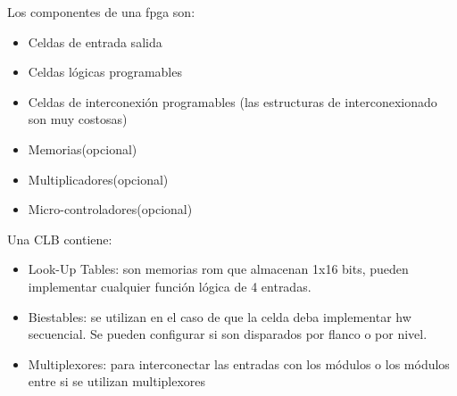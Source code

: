 Los componentes de una \gls{fpga} son:
\begin{itemize}
	\item Celdas de entrada salida
	\item Celdas lógicas programables
	\item Celdas de interconexión programables (las estructuras de interconexionado son muy costosas)
	\item Memorias(opcional)
	\item Multiplicadores(opcional)
	\item Micro-controladores(opcional)
\end{itemize}

Una CLB contiene:
\begin{itemize}
	\item Look-Up Tables: son memorias \gls{rom} que almacenan 1x16 bits, pueden implementar cualquier función lógica de 4 entradas.
	\item Biestables: se utilizan en el caso de que la celda deba implementar \gls{hw} secuencial. Se pueden configurar si son disparados por flanco o por nivel.
	\item Multiplexores: para interconectar las entradas con los módulos o los módulos entre si se utilizan multiplexores
\end{itemize}
